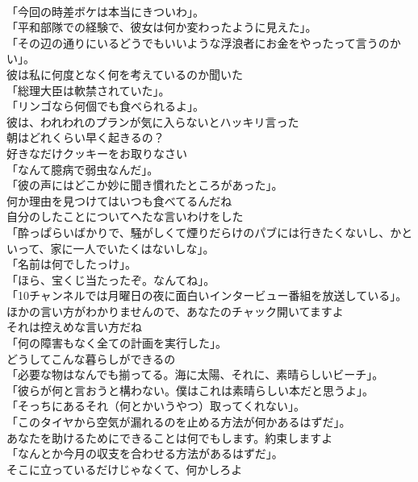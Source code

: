 \documentclass[8pt]{extreport}
\begin{document}
\begin{CJK}{UTF8}{min}
\\	「今回の時差ボケは本当にきついわ」。	
\\	「平和部隊での経験で、彼女は何か変わったように見えた」。	
\\	「その辺の通りにいるどうでもいいような浮浪者にお金をやったって言うのかい」。	
\\	彼は私に何度となく何を考えているのか聞いた	
\\	「総理大臣は軟禁されていた」。	
\\	「リンゴなら何個でも食べられるよ」。	
\\	彼は、われわれのプランが気に入らないとハッキリ言った	
\\	朝はどれくらい早く起きるの？	
\\	好きなだけクッキーをお取りなさい	
\\	「なんて臆病で弱虫なんだ」。	
\\	「彼の声にはどこか妙に聞き慣れたところがあった」。	
\\	何か理由を見つけてはいつも食べてるんだね	
\\	自分のしたことについてへたな言いわけをした	
\\	「酔っぱらいばかりで、騒がしくて煙りだらけのパブには行きたくないし、かといって、家に一人でいたくはないしな」。	
\\	「名前は何でしたっけ」。	
\\	「ほら、宝くじ当たったぞ。なんてね」。	
\\	「10チャンネルでは月曜日の夜に面白いインタービュー番組を放送している」。	
\\	ほかの言い方がわかりませんので、あなたのチャック開いてますよ	
\\	それは控えめな言い方だね	
\\	「何の障害もなく全ての計画を実行した」。	
\\	どうしてこんな暮らしができるの	
\\	「必要な物はなんでも揃ってる。海に太陽、それに、素晴らしいビーチ」。	
\\	「彼らが何と言おうと構わない。僕はこれは素晴らしい本だと思うよ」。	
\\	「そっちにあるそれ（何とかいうやつ）取ってくれない」。	
\\	「このタイヤから空気が漏れるのを止める方法が何かあるはずだ」。	
\\	あなたを助けるためにできることは何でもします。約束しますよ	
\\	「なんとか今月の収支を合わせる方法があるはずだ」。	
\\	そこに立っているだけじゃなくて、何かしろよ	

\end{CJK}
\end{document}
